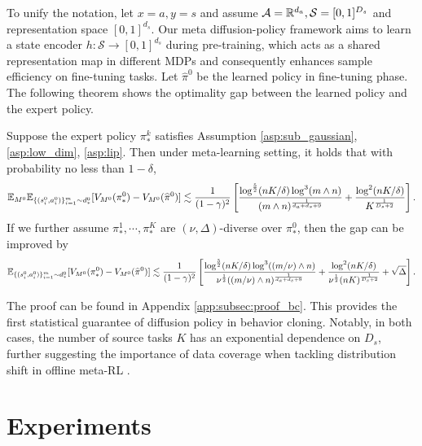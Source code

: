 \documentclass[11pt]{article}
\numberwithin{equation}{section}
\begin{document}
To unify the notation, let $x=a,y=s$ and assume $\mathcal{A}=\mathbb{R}^{d_a},\mathcal{S}=[0,1]^{D_s}$ and representation space $[0,1]^{d_s}$.
Our meta diffusion-policy framework aims to learn a state encoder $h:\mathcal{S}\to[0,1]^{d_s}$ during pre-training, which acts as a shared representation map in different MDPs and consequently enhances sample efficiency on fine-tuning tasks.
Let $\widehat{\pi}^0$ be the learned policy in fine-tuning phase. The following theorem shows the optimality gap between the learned policy and the expert policy.
\begin{thm}\label{thm:behavior_cloning}
    Suppose the expert policy $\pi_*^k$ satisfies Assumption \ref{asp:sub_gaussian}, \ref{asp:low_dim}, \ref{asp:lip}. Then under meta-learning setting, it holds that with probability no less than $1-\delta$, 
    \begin{equation}
        \mathbb{E}_{M^0}\mathbb{E}_{\{(s_i^0,a_i^0)\}_{i=1}^m\sim d_*^0}[V_{M^0}(\pi_*^0)-V_{M^0}(\widehat{\pi}^0)]\lesssim \frac{1}{(1-\gamma)^2}\left[\frac{\log^{\frac{5}{2}}(nK/\delta)\log^3(m\wedge n)}{(m\wedge n)^{\frac{1}{d_a+d_s+9}}}+\frac{\log^2(nK/\delta)}{K^{\frac{1}{D_s+2}}}\right].
    \end{equation}
    If we further assume $\pi_*^1,\cdots,\pi_*^K$ are $(\nu,\Delta)$-diverse over $\pi_*^0$, then the gap can be improved by
    \begin{equation}
        \mathbb{E}_{\{(s_i^0,a_i^0)\}_{i=1}^m\sim d_*^0}[V_{M^0}(\pi_*^0)-V_{M^0}(\widehat{\pi}^0)]\lesssim \frac{1}{(1-\gamma)^2}\left[\frac{\log^{\frac{5}{2}}(nK/\delta)\log^3((m/\nu)\wedge n)}{\nu^{\frac{1}{2}}((m/\nu)\wedge n)^{\frac{1}{d_a+d_s+9}}}+\frac{\log^2(nK/\delta)}{\nu^{\frac{1}{2}}(nK)^{\frac{1}{D_s+2}}}+\sqrt{\Delta}\right].
    \end{equation}
\end{thm}

The proof can be found in Appendix \ref{app:subsec:proof_bc}.
This provides the first statistical guarantee of diffusion policy in behavior cloning.
Notably, in both cases, the number of source tasks $K$ has an exponential dependence on $D_s$, further suggesting the importance of data coverage when tackling distribution shift in offline meta-RL \citep{pong2022offline}.


\section{Experiments}\label{sec:exp}
\end{document}
